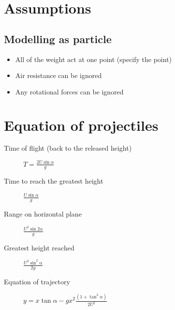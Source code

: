 \section{Assumptions}
\subsection{Modelling as particle}
\begin{itemize}
    \item All of the weight act at one point (specify the point)
    \item Air resistance can be ignored
    \item Any rotational forces can be ignored
\end{itemize}

\section{Equation of projectiles}
\begin{description}
    \item[Time of flight (back to the released height)] $T=\frac{2U\sin\alpha}{g}$
    \item[Time to reach the greatest height] $\frac{U\sin\alpha}{g}$
    \item[Range on horizontal plane] $\frac{U^2\sin 2\alpha}{g}$
    \item[Greatest height reached] $\frac{U^2\sin^2\alpha}{2g}$
    \item[Equation of trajectory] $y=x\tan\alpha - gx^{2}\frac{\left(1+\tan^2\alpha\right)}{2U^2}$ 
\end{description}